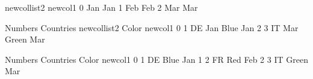 \documentclass[letterpaper,10pt,english]{jupyterBook}
\begin{document}
\begin{sphinxVerbatim}[commandchars=\\\{\}]
\end{sphinxVerbatim}

\begin{sphinxVerbatim}[commandchars=\\\{\}]
  new\PYGZus{}col\PYGZus{}list2 new\PYGZus{}col1
0           Jan      Jan
1           Feb      Feb
2           Mar      Mar
\end{sphinxVerbatim}

\begin{sphinxVerbatim}[commandchars=\\\{\}]
\PYG{p}{[}\PYG{p}{]}
\end{sphinxVerbatim}

\begin{sphinxVerbatim}[commandchars=\\\{\}]
   Numbers Countries new\PYGZus{}col\PYGZus{}list2  Color new\PYGZus{}col1
0        1        DE           Jan   Blue      Jan
2        3        IT           Mar  Green      Mar
\end{sphinxVerbatim}

\begin{sphinxVerbatim}[commandchars=\\\{\}]
\PYG{p}{[}\PYG{p}{]}
\end{sphinxVerbatim}

\begin{sphinxVerbatim}[commandchars=\\\{\}]
   Numbers Countries  Color new\PYGZus{}col1
0        1        DE   Blue      Jan
1        2        FR    Red      Feb
2        3        IT  Green      Mar
\end{sphinxVerbatim}

\begin{sphinxVerbatim}[commandchars=\\\{\}]
\end{sphinxVerbatim}
\end{document}
